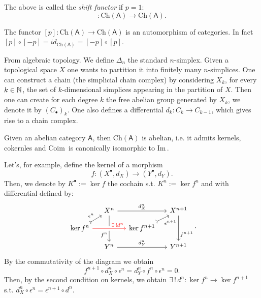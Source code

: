 \begin{rem}
	The above is called the {\em shift functor} if $p = 1$:
	\begin{equation}
		[1]: \mathrm{Ch}(\mathsf{A}) \to \mathrm{Ch}(\mathsf{A}).
	\end{equation} 
\end{rem}

\begin{rem}[]
	The functor $[p]: \mathrm{Ch}(\mathsf{A}) \to \mathrm{Ch}(\mathsf{A})$ is an automorphism of categories.
	In fact $[p] \circ [-p] = id_{\mathrm{Ch}(\mathsf{A})} = [-p] \circ [p]$.	
\end{rem}

\begin{rem}
	From algebraic topology.
	We define $\Delta_n$ the standard $n$-simplex.
	Given a topological space $X$ one wants to partition it into finitely many
	$n$-simplices.
	One can construct a chain (the simplicial chain complex) by considering $X_k$, for every $k \in \mathbb{N}$,
	the set of $k$-dimensional simplices appearing in the partition of $X$.
	Then one can create for each degree $k$ the free abelian group generated by $X_k$, we denote it by $(C_{\bullet})_k$.
	One also defines a differential $d_k: C_k \to C_{k-1}$, which gives rise to a chain complex.
\end{rem}

\begin{prop}
	Given an abelian category $\mathsf{A}$, then $\mathrm{Ch}(\mathsf{A})$ is abelian,
	i.e. it admits kernels, cokernles and $\mathrm{Coim}\, $ is canonically isomorphic to $\mathrm{Im}\, $.
\end{prop}

\begin{ex}
	Let's, for example, define the kernel of a morphism
	\begin{equation}
	f: \left( X^{\bullet}, d_{X} \right) \to \left( Y^{\bullet}, d_{Y} \right)
	.\end{equation} 
	Then, we denote by $K^{\bullet} := \ker f$ the cochain s.t. $K^n := \ker f^n$
	and with differential defined by:
	\begin{equation}
		\begin{tikzcd}[column sep=small, row sep=small]
		& X^n \arrow[rr, "d^n_X", rightarrow] \arrow[dd, "f^n"' near end, rightarrow] & &
		X^{n+1} \arrow[dd, "f^{n+1}" near end, rightarrow] \\
		\ker f^n \arrow[ru, "\epsilon^n", tail]
			\arrow[rr, "\exists\, ! d^n" near end, rightarrow, red, crossing over] & &
		\ker f^{n+1} \arrow[ru, "\epsilon^{n+1}"', tail] \\
		& Y^n \arrow[rr, "d^n_Y", rightarrow] & &
		Y^{n+1}
	\end{tikzcd}
	.\end{equation} 
	By the commutativity of the diagram we obtain
	\begin{equation}
	f^{n+1} \circ d^n_X \circ \epsilon^n = 
	d_Y^n \circ f^n \circ \epsilon^n = 0
	.\end{equation} 
	Then, by the second condition on kernels, we obtain $\exists\, !\, d^n: \ker f^n \to \ker f^{n+1}$ s.t.
	$d^n_X \circ \epsilon^n = \epsilon^{n+1} \circ d^n$.
\end{ex} 

